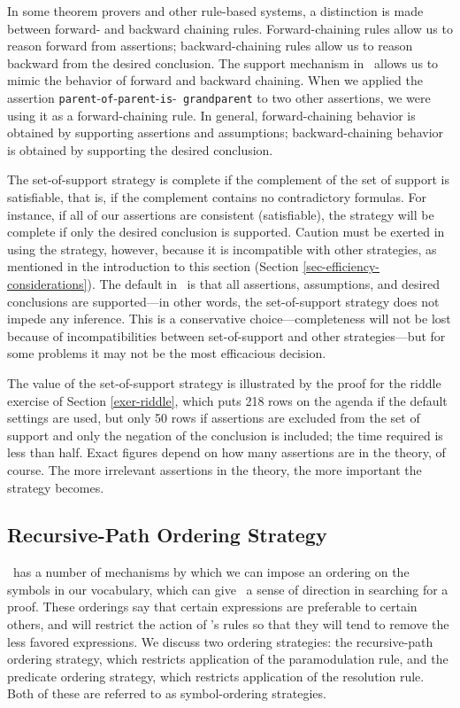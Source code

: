 In some theorem provers and other rule-based systems, a distinction is made
between forward- and backward chaining rules.  Forward-chaining rules allow us
to reason forward from assertions; backward-chaining rules allow us to reason
backward from the desired conclusion.  The support mechanism in \snark\
allows us to mimic the behavior of forward and backward chaining.  When we
applied the assertion {\tt parent}-{\tt of}-{\tt parent}-{\tt is}-{\tt
grandparent} to two other assertions, we were using it as a forward-chaining
rule.  In general, forward-chaining behavior is obtained by supporting
assertions and assumptions;  backward-chaining behavior is obtained by
supporting the desired conclusion.



The set-of-support strategy is complete if the complement of the set of
support is satisfiable, that is, if the complement contains no contradictory
formulas.  For instance, if all of our assertions are consistent
(satisfiable), the strategy will be complete if only the desired
conclusion is supported.
Caution must be exerted in using the strategy, however, because it
is incompatible with other strategies, as mentioned in the introduction to
this section (Section \ref{sec-efficiency-considerations}).  The default in
\snark\  is that all assertions, assumptions, and desired conclusions are
supported---in other words, the set-of-support strategy does not impede any
inference.  This is a conservative choice---completeness will not be lost
because of incompatibilities between set-of-support and other strategies---but
for some problems it may not be the most efficacious decision.

The value of the set-of-support strategy is illustrated by the proof for the
riddle exercise of Section \ref{exer-riddle}, which puts 218 rows on the
agenda if the default settings are used, but only 50 rows if assertions are
excluded from the set of support and only the negation of the conclusion is
included; the time required is less than half.  Exact figures depend on how
many assertions are in the theory, of course.  The more irrelevant assertions
in the theory, the more important the strategy becomes.


\subsection{Recursive-Path Ordering Strategy}
\label{subsec-recursive-path}
 \Snark\  has a number of mechanisms by which we can impose an ordering
on the symbols in our vocabulary, which can give \snark\  a sense of
direction in searching for a proof.  These orderings say that certain
expressions are preferable to certain others, and will restrict the
action of \snark\/'s rules so that they will tend to remove the less
favored expressions.  We discuss two ordering strategies: the
recursive-path ordering strategy, which restricts application of the
paramodulation rule, and the predicate ordering strategy, which
restricts application of the resolution rule.  Both of these are
referred to as symbol-ordering strategies.

